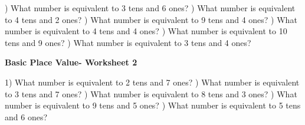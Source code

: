 \documentclass{article}%
\begin{document}
\newline%
) What number is equivalent to 3 tens and 6 ones?%
\newline%
\newline%
) What number is equivalent to 4 tens and 2 ones?%
\newline%
\newline%
) What number is equivalent to 9 tens and 4 ones?%
\newline%
\newline%
) What number is equivalent to 4 tens and 4 ones?%
\newline%
\newline%
) What number is equivalent to 10 tens and 9 ones?%
\newline%
\newline%
) What number is equivalent to 3 tens and 4 ones?%
\newline%
\newline%
\newline%
\pagebreak%
\large%
\begin{center}%
\textbf{Basic Place Value- Worksheet 2}%
\newline%
\newline%
\newline%
\end{center} \normalsize%
1) What number is equivalent to 2 tens and 7 ones?%
\newline%
\newline%
) What number is equivalent to 3 tens and 7 ones?%
\newline%
\newline%
) What number is equivalent to 8 tens and 3 ones?%
\newline%
\newline%
) What number is equivalent to 9 tens and 5 ones?%
\newline%
\newline%
) What number is equivalent to 5 tens and 6 ones?%
\newline%
\newline%
\end{document}
